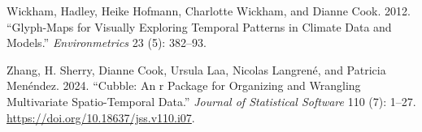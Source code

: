 \hypertarget{refs}{}
\begin{CSLReferences}{1}{0}
\leavevmode{}%
Wickham, Hadley, Heike Hofmann, Charlotte Wickham, and Dianne Cook. 2012. {``Glyph-Maps for Visually Exploring Temporal Patterns in Climate Data and Models.''} \emph{Environmetrics} 23 (5): 382--93.

\leavevmode{}%
Zhang, H. Sherry, Dianne Cook, Ursula Laa, Nicolas Langrené, and Patricia Menéndez. 2024. {``Cubble: An r Package for Organizing and Wrangling Multivariate Spatio-Temporal Data.''} \emph{Journal of Statistical Software} 110 (7): 1--27. \url{https://doi.org/10.18637/jss.v110.i07}.

\end{CSLReferences}


\address{%
Maliny Po\\
Monash University\\%
Department of Econometrics and Business Statistics\\ Melbourne, Australia\\
%
%
\textit{ORCiD: \href{https://orcid.org/0009-0008-4686-6631}{0009-0008-4686-6631}}\\%
\href{mailto:malinypo12@gmail.com}{\nolinkurl{malinypo12@gmail.com}}%
}

\address{%
Dianne Cook\\
Monash University\\%
Department of Econometrics and Business Statistics\\ Melbourne, Australia\\
%
%
\textit{ORCiD: \href{https://orcid.org/0000-0002-3813-7155}{0000-0002-3813-7155}}\\%
\href{mailto:dicook@monash.edu}{\nolinkurl{dicook@monash.edu}}%
}
